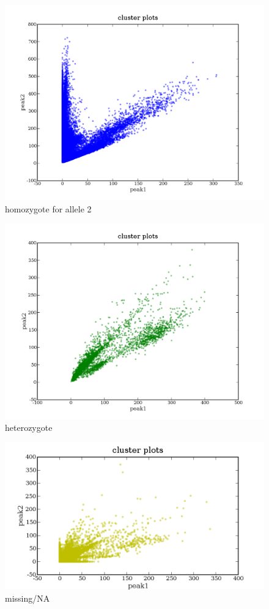 \documentclass[a4paper,10pt]{article}
\begin{document}
\begin{figure}
\includegraphics[width=1\textwidth]{figures/cluster_plots_allele2.png}
\caption{homozygote for allele 2}\label{f2}
\end{figure}

\begin{figure}
\includegraphics[width=1\textwidth]{figures/cluster_plots_het.png}
\caption{heterozygote}\label{f3}
\end{figure}

\begin{figure}
\includegraphics[width=1\textwidth]{figures/cluster_plots_NA.png}
\caption{missing/NA}\label{f4}
\end{figure}
\end{document}
